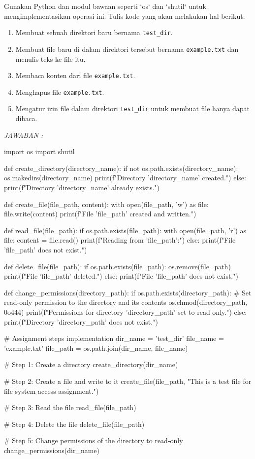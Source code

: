 \documentclass[12pt]{article}
\begin{document}
    Gunakan Python dan modul bawaan seperti `os` dan `shutil` untuk mengimplementasikan operasi ini. Tulis kode yang akan melakukan hal berikut:
\begin{enumerate}
    \item Membuat sebuah direktori baru bernama \texttt{test\_dir}.
    \item Membuat file baru di dalam direktori tersebut bernama \texttt{example.txt} dan menulis teks ke file itu.
    \item Membaca konten dari file \texttt{example.txt}.
    \item Menghapus file \texttt{example.txt}.
    \item Mengatur izin file dalam direktori \texttt{test\_dir} untuk membuat file hanya dapat dibaca.
\end{enumerate}
\textit{JAWABAN :}
\begin{python}
import os
import shutil

def create_directory(directory_name):
    if not os.path.exists(directory_name):
        os.makedirs(directory_name)
        print(f"Directory '{directory_name}' created.")
    else:
        print(f"Directory '{directory_name}' already exists.")

def create_file(file_path, content):
    with open(file_path, 'w') as file:
        file.write(content)
        print(f"File '{file_path}' created and written.")

def read_file(file_path):
    if os.path.exists(file_path):
        with open(file_path, 'r') as file:
            content = file.read()
            print(f"Reading from '{file_path}':")
    else:
        print(f"File '{file_path}' does not exist.")

def delete_file(file_path):
    if os.path.exists(file_path):
        os.remove(file_path)
        print(f"File '{file_path}' deleted.")
    else:
        print(f"File '{file_path}' does not exist.")

def change_permissions(directory_path):
    if os.path.exists(directory_path):
        # Set read-only permission to the directory and its contents
        os.chmod(directory_path, 0o444)
        print(f"Permissions for directory '{directory_path}' set to read-only.")
    else:
        print(f"Directory '{directory_path}' does not exist.")

# Assignment steps implementation
dir_name = 'test_dir'
file_name = 'example.txt'
file_path = os.path.join(dir_name, file_name)

# Step 1: Create a directory
create_directory(dir_name)

# Step 2: Create a file and write to it
create_file(file_path, "This is a test file for file system access assignment.")

# Step 3: Read the file
read_file(file_path)

# Step 4: Delete the file
delete_file(file_path)

# Step 5: Change permissions of the directory to read-only
change_permissions(dir_name)
\end{python}
\end{document}
